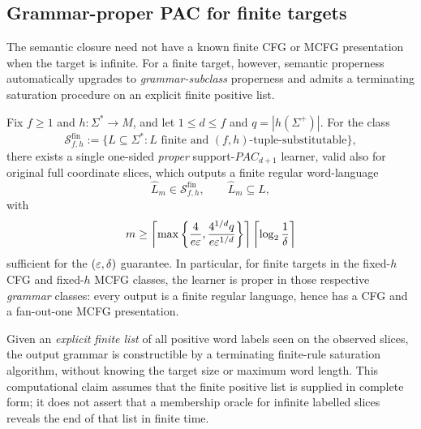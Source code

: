
\subsection{Grammar-proper PAC for finite targets}
\label{subsec:finite-target-proper}

The semantic closure need not have a known finite CFG or
MCFG presentation when the target is infinite.
For a finite target, however, semantic properness
automatically upgrades to \emph{grammar-subclass}
properness and admits a terminating saturation
procedure on an explicit finite positive list.

\begin{theorem}
\label{thm:finite-target-proper-pac}
Fix \(f\ge1\) and \(h:\Sigma^*\to M\), and
let \(1\le d\le f\) and \(q=|h(\Sigma^+)|\).
For the class
\[
 \mathcal S^{\mathrm{fin}}_{f,h}
 :=\{L\subseteq\Sigma^*:L\text{ finite and }
             (f,h)\text{-tuple-substitutable}\},
\]
there exists a single one-sided \emph{proper}
support-\(PAC_{d+1}\) learner, valid also for
original full coordinate slices, which outputs a
finite regular word-language
\[
 \widehat L_m\in\mathcal S^{\mathrm{fin}}_{f,h},
 \qquad \widehat L_m\subseteq L,
\]
with
\[
 m\ge
 \left\lceil
 \max\left\{
 \frac{4}{e\varepsilon},
 \frac{4^{1/d}q}{e\varepsilon^{1/d}}
 \right\}
 \right\rceil
 \left\lceil\log_2\frac1\delta\right\rceil
\]
sufficient for the \((\varepsilon,\delta)\) guarantee.
In particular, for finite targets in the fixed-\(h\)
CFG and fixed-\(h\) MCFG classes, the learner is
proper in those respective \emph{grammar} classes:
every output is a finite regular language, hence
has a CFG and a fan-out-one MCFG presentation.

Given an \emph{explicit finite list} of all positive
word labels seen on the observed slices, the output
grammar is constructible by a terminating
finite-rule saturation algorithm, without knowing
the target size or maximum word length.
This computational claim assumes that the finite
positive list is supplied in complete form; it does
not assert that a membership oracle for infinite
labelled slices reveals the end of that list in
finite time.
\end{theorem}

